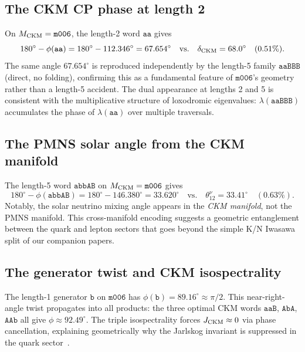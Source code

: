 \documentclass[a4paper,11pt]{article}
\newcommand{\mfld}[1]{\texttt{#1}}
\newcommand{\word}[1]{\texttt{#1}}
\newcommand{\degr}{^{\circ}}
\begin{document}
\subsection{The CKM CP phase at length 2}
\label{sec:delta_ckm}

On $M_{\rm CKM}=\mfld{m006}$, the length-2 word $\word{aa}$ gives
\begin{equation}
  180\degr - \phi(\word{aa}) = 180\degr - 112.346\degr = 67.654\degr
  \quad\text{vs.}\quad \delta_{\rm CKM}=68.0\degr \quad (0.51\%).
\end{equation}
The same angle $67.654\degr$ is reproduced independently by the length-5
family $\word{aaBBB}$ (direct, no folding), confirming this as a
fundamental feature of $\mfld{m006}$'s geometry rather than a length-5 accident.
The dual appearance at lengths 2 and 5 is consistent with the multiplicative
structure of loxodromic eigenvalues: $\lambda(\word{aaBBB})$ accumulates the
phase of $\lambda(\word{aa})$ over multiple traversals.

\subsection{The PMNS solar angle from the CKM manifold}
\label{sec:theta12nu}

The length-5 word $\word{abbAB}$ on $M_{\rm CKM}=\mfld{m006}$ gives
\begin{equation}
  180\degr - \phi(\word{abbAB}) = 180\degr - 146.380\degr = 33.620\degr
  \quad\text{vs.}\quad \theta_{12}^\nu=33.41\degr \quad (0.63\%).
\end{equation}
Notably, the solar neutrino mixing angle appears in the \emph{CKM manifold},
not the PMNS manifold.
This cross-manifold encoding suggests a geometric entanglement between the
quark and lepton sectors that goes beyond the simple K/N Iwasawa split
of our companion papers.

\subsection{The generator twist and CKM isospectrality}
\label{sec:generator}

The length-1 generator $\word{b}$ on $\mfld{m006}$ has
$\phi(\word{b})=89.16\degr\approx\pi/2$.
This near-right-angle twist propagates into all products: the three optimal
CKM words $\word{aaB}$, $\word{AbA}$, $\word{AAb}$ all give
$\phi\approx 92.49\degr$.
The triple isospectrality forces $J_{\rm CKM}\approx 0$ via phase cancellation,
explaining geometrically why the Jarlskog invariant is suppressed in the
quark sector~\cite{GentryCKM}.
\end{document}
